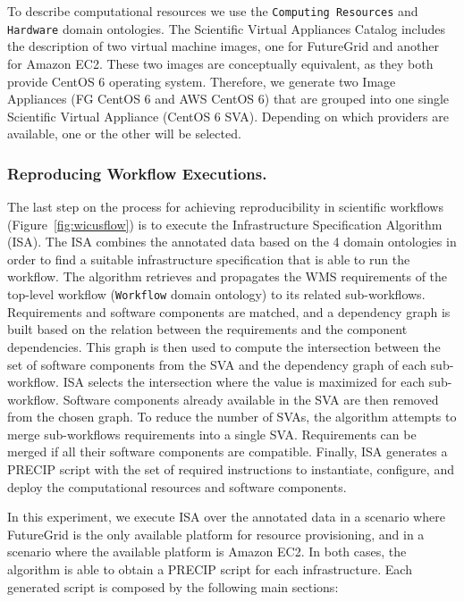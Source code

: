 \documentclass[final,5p,times,twocolumn]{elsarticle}
\begin{document}
To describe computational resources we use the \texttt{Computing Resources} and \texttt{Hardware} domain ontologies. The Scientific Virtual Appliances Catalog includes the description of two virtual machine images, one for FutureGrid and another for Amazon EC2. These two images are conceptually equivalent, as they both provide CentOS 6 operating system.
Therefore, we generate two Image Appliances (FG CentOS 6 and AWS CentOS 6) that are grouped into one single Scientific Virtual Appliance (CentOS 6 SVA). Depending on which providers are available, one or the other will be selected.


\subsubsection{Reproducing Workflow Executions.}

The last step on the process for achieving reproducibility in scientific workflows (Figure~\ref{fig:wicusflow}) is to execute the Infrastructure Specification Algorithm (ISA). The ISA combines the annotated data based on the 4 domain ontologies in order to find a suitable infrastructure specification that is able to run the workflow. The algorithm retrieves and propagates the WMS requirements of the top-level workflow (\texttt{Workflow} domain ontology) to its related sub-workflows. Requirements and software components are matched, and a dependency graph is built based on the relation between the requirements and the component dependencies. This graph is then used to compute the intersection between the set of software components from the SVA and the dependency graph of each sub-workflow. ISA selects the intersection where the value is maximized for each sub-workflow. Software components already available in the SVA are then removed from the chosen graph. To reduce the number of SVAs, the algorithm attempts to merge sub-workflows requirements into a single SVA. Requirements can be merged if all their software components are compatible. Finally, ISA generates a PRECIP script with the set of required instructions to instantiate, configure, and deploy the computational resources and software components.


In this experiment, we execute ISA over the annotated data in a scenario where FutureGrid is the only available platform for resource provisioning, and in a scenario where the available platform is Amazon EC2. In both cases, the algorithm is able to obtain a PRECIP script for each infrastructure. Each generated script is composed by the following main sections:
\end{document}
